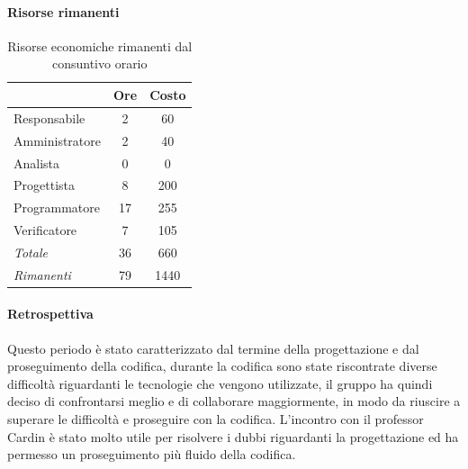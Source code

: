 \documentclass[a4paper,12pt]{article}
\begin{document}
            \paragraph{Risorse rimanenti}
                \begin{table}[H]
                \centering
                \caption{Risorse economiche rimanenti dal consuntivo orario}
                \begin{tabular}{|l|c|c|}
                \hline
                    \rowcolor{lightgray}{\textbf{Ruolo}} & {\textbf{Ore}} & {\textbf{Costo}}\\
                \hline
                    Responsabile & 2 & 60\\
                \hline
                    Amministratore & 2 & 40\\
                \hline
                    Analista & 0 & 0\\
                \hline
                    Progettista & 8 & 200\\
                \hline
                    Programmatore & 17 & 255\\
                \hline
                    Verificatore & 7 & 105\\
                \hline
                    \rowcolor{lightgray}\textit{Totale} & 36 & 660\\
                \hline
                    \rowcolor{lightgray}\textit{Rimanenti} & 79 & 1440\\
                \hline
                \end{tabular}
                \end{table}
                
            \paragraph{Retrospettiva}
            Questo periodo è stato caratterizzato dal termine della progettazione e dal proseguimento della codifica, durante la codifica sono state riscontrate diverse difficoltà riguardanti le tecnologie che vengono utilizzate, il gruppo ha quindi deciso di confrontarsi meglio e di collaborare maggiormente, in modo da riuscire a superare le difficoltà e proseguire con la codifica.
            L'incontro con il professor Cardin è stato molto utile per risolvere i dubbi riguardanti la progettazione ed ha permesso un proseguimento più fluido della codifica.

\end{document}
